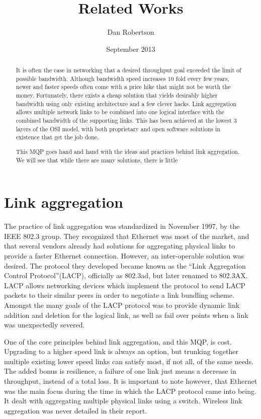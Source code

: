 \documentclass{article}
\begin{document}
\title{Related Works}
\author{Dan Robertson}
\date{September 2013}
\maketitle

\begin{abstract}

It is often the case in networking that a desired throughput goal exceeded the limit of possible bandwidth. Although bandwidth speed increases 10 fold every few years, newer and faster speeds often come with a price hike that might not be worth the money. Fortunately, there exists a cheap solution that yields desirably higher bandwidth using only existing architecture and a few clever hacks. Link aggregation allows multiple network links to be combined into one logical interface with the combined bandwidth of the supporting links. This has been achieved at the lowest 3 layers of the OSI model, with both proprietary and open software solutions in existence that get the job done.

This MQP goes hand and hand with the ideas and practices behind link aggregation. We will see that while there are many solutions, there is little 

\end{abstract}

\section{Link aggregation}

The practice of link aggregation was standardized in November 1997, by the IEEE 802.3 group. They recognized that Ethernet was most of the market, and that several vendors already had solutions for aggregating physical links to provide a faster Ethernet connection. However, an inter-operable solution was desired. The protocol they developed became known as the ``Link Aggregation Control Protocol''(LACP), officially as 802.3ad, but later renamed to 802.3AX. LACP allows networking devices which implement the protocol to send LACP packets to their similar peers in order to negotiate a link bundling scheme. Amongst the many goals of the LACP protocol was to provide dynamic link addition and deletion for the logical link, as well as fail over points when a link was unexpectedly severed. 

One of the core principles behind link aggregation, and this MQP, is cost. Upgrading to a higher speed link is always an option, but trunking together multiple existing lower speed links can satisfy most, if not all, of the same needs. The added bonus is resilience, a failure of one link just means a decrease in throughput, instead of a total loss. It is important to note however, that Ethernet was the main focus during the time in which the LACP protocol came into being. It dealt with aggregating multiple physical links using a switch. Wireless link aggregation was never detailed in their report.
\end{document}
